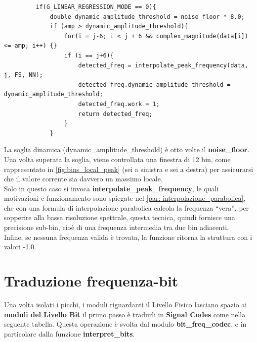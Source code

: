  \begin{verbatim}
         if(G_LINEAR_REGRESSION_MODE == 0){
             double dynamic_amplitude_threshold = noise_floor * 8.0;
             if (amp > dynamic_amplitude_threshold){
                 for(i = j-6; i < j + 6 && complex_magnitude(data[i]) <= amp; i++) {}
                 if (i == j+6){
                     detected_freq = interpolate_peak_frequency(data, j, FS, NN);
                     detected_freq.dynamic_amplitude_threshold = dynamic_amplitude_threshold;
                     detected_freq.work = 1;
                     return detected_freq;
                 }
             }
 \end{verbatim}
 
La soglia dinamica (dynamic\_amplitude\_threshold) è otto volte il \textbf{noise\_floor}.
 Una volta superata la soglia, viene controllata una finestra di 12 bin, come rappresentato in \autoref{fig:bins_local_peak} (sei a sinistra e sei a destra) 
 per assicurarsi che il valore corrente sia davvero un massimo locale. \\
Solo in questo caso si invoca \textbf{interpolate\_peak\_frequency}, le quali motivazioni e funzionamento sono spiegate nel \autoref{par: interpolazione_parabolica},
 che con una formula di interpolazione parabolica calcola la frequenza “vera”, 
per sopperire alla bassa risoluzione spettrale, questa tecnica, quindi fornisce una precisione sub-bin, cioè di una frequenza intermedia tra due bin adiacenti.\\  

 
 Infine, se nessuna frequenza valida è trovata, la funzione ritorna la struttura con i valori -1.0.  
 
 \newpage
 \section{Traduzione frequenza-bit}
 
 Una volta isolati i picchi, i moduli riguardanti il Livello Fisico lasciano spazio ai \textbf{moduli del Livello Bit} il primo passo è tradurli in 
 \textbf{Signal Codes} come nella seguente tabella.
  Questa operazione è svolta dal modulo \textbf{bit\_freq\_codec}, e in particolare dalla funzione \textbf{interpret\_bits}.  



